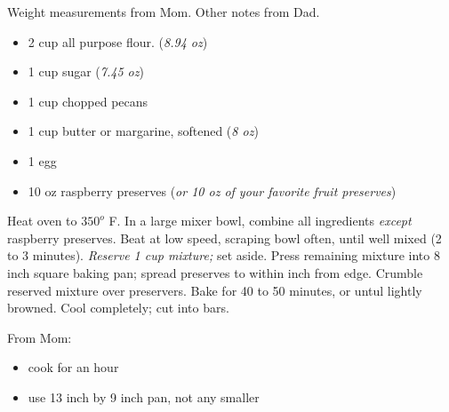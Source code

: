 
Weight measurements from Mom. Other notes from Dad.

\ingredients
\begin{itemize}
    \item 2  cup all purpose flour. (\textit{8.94 oz})
    \item 1 cup sugar (\textit{7.45 oz})
    \item 1 cup chopped pecans
    \item 1 cup butter or margarine, softened (\textit{8 oz})
    \item 1 egg
    \item 10 oz raspberry preserves (\textit{or 10 oz of your favorite fruit preserves})
\end{itemize}

\instructions

Heat oven to $350 ^o$ F. 
In a large mixer bowl, combine all ingredients \textit{except} raspberry preserves.
Beat at low speed, scraping bowl often, until well mixed (2 to 3 minutes).
\textit{Reserve 1  cup mixture;} set aside.
Press remaining mixture into 8 inch square baking pan; spread preserves to within  inch from edge.
Crumble reserved  mixture over preservers.
Bake for 40 to 50 minutes, or untul lightly browned.
Cool completely; cut into bars.

\notes
From Mom:
\begin{itemize}
    \item cook for an hour
    \item use 13 inch by 9 inch pan, not any smaller
    
\end{itemize}